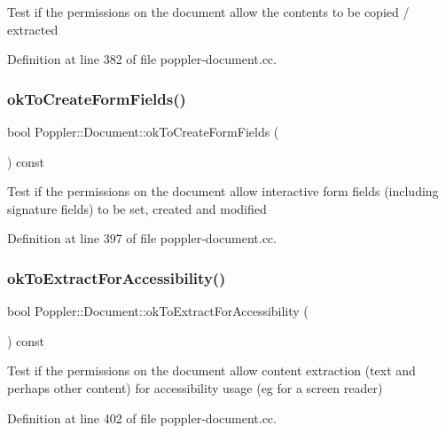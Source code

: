 Test if the permissions on the document allow the contents to be copied / extracted 

Definition at line 382 of file poppler-\/document.\+cc.

\mbox{\label{class_poppler_1_1_document_a19f94305b3a268141f8bf350334cfb33}} 
\subsubsection{\texorpdfstring{ok\+To\+Create\+Form\+Fields()}{okToCreateFormFields()}}
{\footnotesize\ttfamily bool Poppler\+::\+Document\+::ok\+To\+Create\+Form\+Fields (\begin{DoxyParamCaption}{ }\end{DoxyParamCaption}) const}

Test if the permissions on the document allow interactive form fields (including signature fields) to be set, created and modified 

Definition at line 397 of file poppler-\/document.\+cc.

\mbox{\label{class_poppler_1_1_document_a9c792ce1274bace5cf18cf77934f993e}} 
\subsubsection{\texorpdfstring{ok\+To\+Extract\+For\+Accessibility()}{okToExtractForAccessibility()}}
{\footnotesize\ttfamily bool Poppler\+::\+Document\+::ok\+To\+Extract\+For\+Accessibility (\begin{DoxyParamCaption}{ }\end{DoxyParamCaption}) const}

Test if the permissions on the document allow content extraction (text and perhaps other content) for accessibility usage (eg for a screen reader) 

Definition at line 402 of file poppler-\/document.\+cc.

